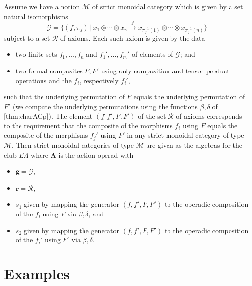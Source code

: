 \documentclass{amsbook} %
\newcommand{\mb}{\mathbf}
\numberwithin{section}{chapter}
\begin{document}
\begin{cor}\label{pres2}
Assume we have a notion $\mathcal{M}$ of strict monoidal category which is given by  a set natural isomorphisms
\[
\mathcal{G} = \{ (f, \pi_{f}) \, | \,  x_{1} \otimes \cdots \otimes x_{n} \stackrel{f}{\longrightarrow} x_{\pi_{f}^{-1}(1)} \otimes \cdots \otimes x_{\pi_{f}^{-1}(n)} \}
\]
subject to a set $\mathcal{R}$ of axioms.  Each such axiom is given by the data
\begin{itemize}
\item two finite sets $f_{1}, \ldots, f_{n}$ and $f_{1}', \ldots, f_{m}'$ of elements of $\mathcal{G}$; and
\item two formal composites $F,F'$ using only composition and tensor product operations and the $f_{i}$, respectively $f_{i}'$, 
\end{itemize}
such that the underlying permutation of $F$ equals the underlying permutation of $F'$ (we compute the underlying permutations using the functions $\beta, \delta$ of \cref{thm:charAOp}).  The element $(\underline{f}, \underline{f}', F, F')$ of the set $\mathcal{R}$ of axioms corresponds to the requirement that the composite of the morphisms $f_{i}$ using $F$ equals the composite of the morphisms $f_{j}'$ using $F'$ in any strict monoidal category of type $\mathcal{M}$.  Then strict monoidal categories of type $\mathcal{M}$ are given as the algebras for the club $E\Lambda$ where $\mb{\Lambda}$ is the action operad with
\begin{itemize}
\item $\mathbf{g} = \mathcal{G}$,
\item $\mathbf{r} = \mathcal{R}$,
\item $s_{1}$ given by mapping the generator $(\underline{f}, \underline{f}', F, F')$ to the operadic composition of the $f_{i}$ using $F$ via $\beta, \delta$, and
\item $s_{2}$ given by mapping the generator $(\underline{f}, \underline{f}', F, F')$ to the operadic composition of the $f_{i}'$ using $F'$ via $\beta, \delta$.
\end{itemize}
\end{cor}

\section{Examples}\label{sec:examples}
\end{document}
